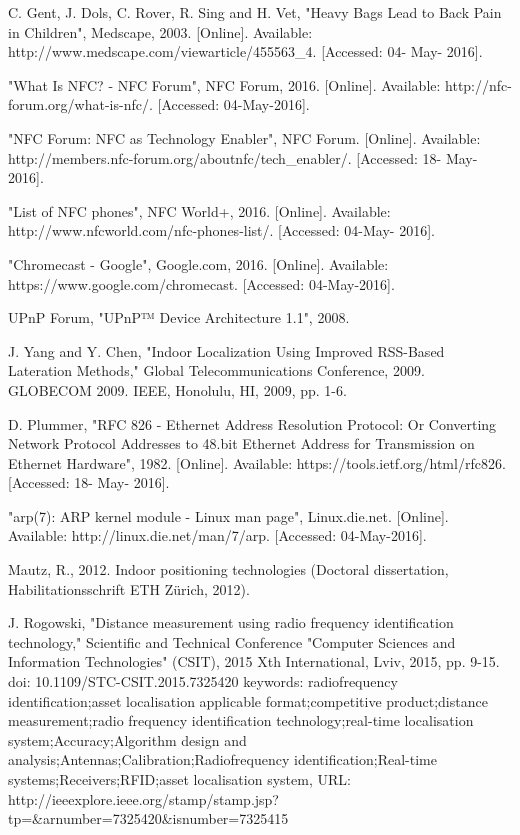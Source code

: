 \begin{thebibliography}{1}




C. Gent, J. Dols, C. Rover, R. Sing and H. Vet, "Heavy Bags Lead to Back Pain in Children", Medscape, 2003. [Online]. Available: http://www.medscape.com/viewarticle/455563\_4. [Accessed: 04- May- 2016].

  "What Is NFC? - NFC Forum", NFC Forum, 2016. [Online]. Available: http://nfc-forum.org/what-is-nfc/. [Accessed: 04-May-2016].

"NFC Forum: NFC as Technology Enabler", NFC Forum. [Online]. Available: http://members.nfc-forum.org/aboutnfc/tech\_enabler/. [Accessed: 18- May- 2016].

"List of NFC phones", NFC World+, 2016. [Online]. Available: http://www.nfcworld.com/nfc-phones-list/. [Accessed: 04-May- 2016].

  "Chromecast - Google", Google.com, 2016. [Online]. Available: https://www.google.com/chromecast. [Accessed: 04-May-2016].
  
  UPnP Forum, "UPnP™ Device Architecture 1.1", 2008. 
  
J. Yang and Y. Chen, "Indoor Localization Using Improved RSS-Based Lateration Methods," Global Telecommunications Conference, 2009. GLOBECOM 2009. IEEE, Honolulu, HI, 2009, pp. 1-6.

D. Plummer, "RFC 826 - Ethernet Address Resolution Protocol: Or Converting Network Protocol Addresses to 48.bit Ethernet Address for Transmission on Ethernet Hardware", 1982. [Online]. Available: https://tools.ietf.org/html/rfc826. [Accessed: 18- May- 2016].

"arp(7): ARP kernel module - Linux man page", Linux.die.net. [Online]. Available: http://linux.die.net/man/7/arp. [Accessed: 04-May-2016].

Mautz, R., 2012. Indoor positioning technologies (Doctoral dissertation, Habilitationsschrift ETH Zürich, 2012).

J. Rogowski, "Distance measurement using radio frequency identification technology," Scientific and Technical Conference "Computer Sciences and Information Technologies" (CSIT), 2015 Xth International, Lviv, 2015, pp. 9-15.
doi: 10.1109/STC-CSIT.2015.7325420
keywords: {radiofrequency identification;asset localisation applicable format;competitive product;distance measurement;radio frequency identification technology;real-time localisation system;Accuracy;Algorithm design and analysis;Antennas;Calibration;Radiofrequency identification;Real-time systems;Receivers;RFID;asset localisation system},
URL: http://ieeexplore.ieee.org/stamp/stamp.jsp?tp=\&arnumber=7325420\&isnumber=7325415


\end{thebibliography}
